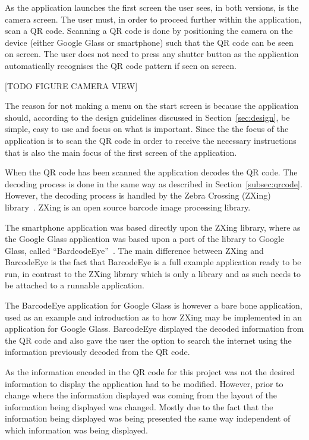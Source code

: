 As the application launches the first screen the user sees, in both versions, is the camera screen. The user must, in order to proceed further within the application, scan a QR code. Scanning a QR code is done by positioning the camera on the device (either Google Glass or smartphone) such that the QR code can be seen on screen. The user does not need to press any shutter button as the application automatically recognises the QR code pattern if seen on screen.%

[TODO FIGURE CAMERA VIEW]

The reason for not making a menu on the start screen is because the application should, according to the design guidelines discussed in Section~\ref{sec:design}, be simple, easy to use and focus on what is important. Since the the focus of the application is to scan the QR code in order to receive the necessary instructions that is also the main focus of the first screen of the application.

When the QR code has been scanned the application decodes the QR code. The decoding process is done in the same way as described in Section~\ref{subsec:qrcode}. However, the decoding process is handled by the Zebra Crossing (ZXing) library~\cite{zxing}. ZXing is an open source barcode image processing library.

The smartphone application was based directly upon the ZXing library, where as the Google Glass application was based upon a port of the library to Google Glass, called ``BardcodeEye''~\cite{barcodeEye}. The main difference between ZXing and BarcodeEye is the fact that BarcodeEye is a full example application ready to be run, in contrast to the ZXing library which is only a library and as such needs to be attached to a runnable application.

The BarcodeEye application for Google Glass is however a bare bone application, used as an example and introduction as to how ZXing may be implemented in an application for Google Glass. BarcodeEye displayed the decoded information from the QR code and also gave the user the option to search the internet using the information previously decoded from the QR code.

As the information encoded in the QR code for this project was not the desired information to display the application had to be modified. However, prior to change where the information displayed was coming from the layout of the information being displayed was changed. Mostly due to the fact that the information being displayed was being presented the same way independent of which information was being displayed.


